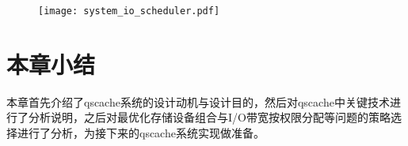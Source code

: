 \begin{figure}[!htbp]
    \centering
    \texttt{[image: system\_io\_scheduler.pdf]}
\end{figure}

\section{本章小结}

本章首先介绍了qscache系统的设计动机与设计目的，然后对qscache中关键技术进行了分析说明，之后对最优化存储设备组合与I/O带宽按权限分配等问题的策略选择进行了分析，为接下来的qscache系统实现做准备。
